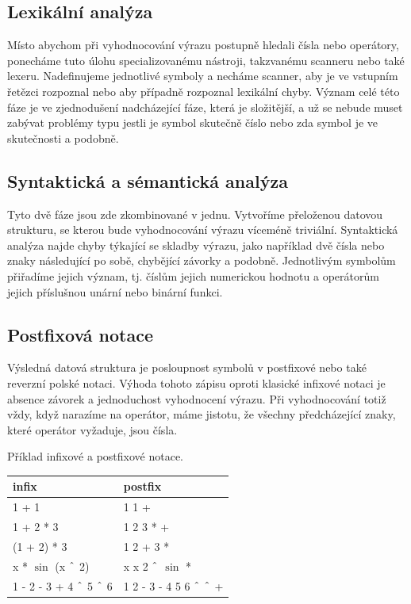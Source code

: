 \documentclass[11pt]{article}
\newcommand\CARET{\mathbin{\char`\^}}
\begin{document}
\subsection{Lexikální analýza}
Místo abychom při vyhodnocování výrazu postupně hledali čísla nebo operátory,
ponecháme tuto úlohu specializovanému nástroji, takzvanému scanneru nebo také
lexeru. Nadefinujeme jednotlivé symboly a necháme scanner, aby je ve vstupním
řetězci rozpoznal nebo aby případně rozpoznal lexikální chyby.  Význam celé
této fáze je ve zjednodušení nadcházející fáze, která je složitější, a už se
nebude muset zabývat problémy typu jestli je symbol skutečně číslo nebo zda
symbol  je ve skutečnosti  a podobně.

\subsection{Syntaktická a sémantická analýza}
Tyto dvě fáze jsou zde zkombinované v jednu. Vytvoříme přeloženou datovou
strukturu, se kterou bude vyhodnocování výrazu víceméně triviální. Syntaktická
analýza najde chyby týkající se skladby výrazu, jako například dvě čísla nebo
znaky následující po sobě, chybějící závorky a podobně. Jednotlivým symbolům
přiřadíme jejich význam, tj. číslům jejich numerickou hodnotu a operátorům
jejich příslušnou unární nebo binární funkci. 

\subsection{Postfixová notace}
Výsledná datová struktura je posloupnost symbolů v postfixové nebo také
reverzní polské notaci. Výhoda tohoto zápisu oproti klasické infixové notaci
je absence závorek a jednoduchost vyhodnocení výrazu. Při vyhodnocování totiž
vždy, když narazíme na operátor, máme jistotu, že všechny předcházející znaky, 
které operátor vyžaduje, jsou čísla.

Příklad infixové a postfixové notace.
\begin{center}
\begin{tabular}{|l|l|}
\hline
infix & postfix \\
\hline
1 + 1 & 1 1 + \\
1 + 2 * 3 & 1 2 3 * + \\
(1 + 2) * 3 & 1 2 + 3 * \\
x * $\sin$ (x $\CARET$ 2) & x x 2 $\CARET$ $\sin$ * \\
1 - 2 - 3 + 4 $\CARET$ 5 $\CARET$ 6 & 1 2 - 3 - 4 5 6 $\CARET$ $\CARET$ + \\
\hline
\end{tabular}
\end{center}
\end{document}
